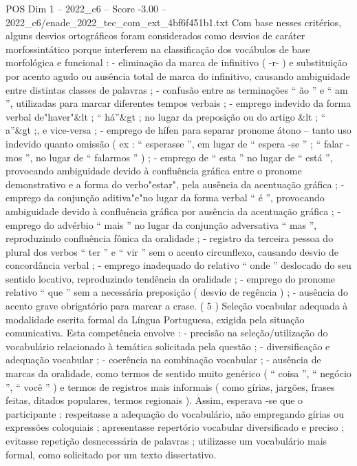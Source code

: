 \begin{textsample}{POS Dim 1 – 2022\_c6 – Score -3.00 – 2022\_c6/enade\_2022\_tec\_com\_ext\_4bf6f451b1.txt}
Com base nesses critérios, alguns desvios ortográficos foram considerados como desvios de caráter morfossintático porque interferem na classificação dos vocábulos de base morfológica e funcional : - eliminação da marca de infinitivo ( -r- ) e substituição por acento agudo ou ausência total de marca do infinitivo, causando ambiguidade entre distintas classes de palavras ; - confusão entre as terminações “ ão ” e “ am ”, utilizadas para marcar diferentes tempos verbais ; - emprego indevido da forma verbal de"haver"\&lt ; “ há”\&gt ; no lugar da preposição ou do artigo \&lt ; “ a”\&gt ;, e vice-versa ; - emprego de hífen para separar pronome átono – tanto uso indevido quanto omissão ( ex : “ esperasse ”, em lugar de “ espera -se ” ; “ falar -mos ”, no lugar de “ falarmos ” ) ; - emprego de “ esta ” no lugar de “ está ”, provocando ambiguidade devido à confluência gráfica entre o pronome demonstrativo e a forma do verbo"estar", pela ausência da acentuação gráfica ; - emprego da conjunção aditiva"e"no lugar da forma verbal “ é ”, provocando ambiguidade devido à confluência gráfica por ausência da acentuação gráfica ; - emprego do advérbio “ mais ” no lugar da conjunção adversativa “ mas ”, reproduzindo confluência fônica da oralidade ; - registro da terceira pessoa do plural dos verbos “ ter ” e “ vir ” sem o acento circunflexo, causando desvio de concordância verbal ; - emprego inadequado do relativo “ onde ” deslocado do seu sentido locativo, reproduzindo tendência da oralidade ; - emprego do pronome relativo “ que ” sem a necessária preposição ( desvio de regência ) ; - ausência do acento grave obrigatório para marcar a crase. ( 5 ) Seleção vocabular adequada à modalidade escrita formal da Língua Portuguesa, exigida pela situação comunicativa.
Esta competência envolve : - precisão na seleção/utilização do vocabulário relacionado à temática solicitada pela questão ; - diversificação e adequação vocabular ; - coerência na combinação vocabular ; - ausência de marcas da oralidade, como termos de sentido muito genérico ( “ coisa ”, “ negócio ”, “ você ” ) e termos de registros mais informais ( como gírias, jargões, frases feitas, ditados populares, termos regionais ).
Assim, esperava -se que o participante : respeitasse a adequação do vocabulário, não empregando gírias ou expressões coloquiais ; apresentasse repertório vocabular diversificado e preciso ; evitasse repetição desnecessária de palavras ; utilizasse um vocabulário mais formal, como solicitado por um texto dissertativo.

\end{textsample}
